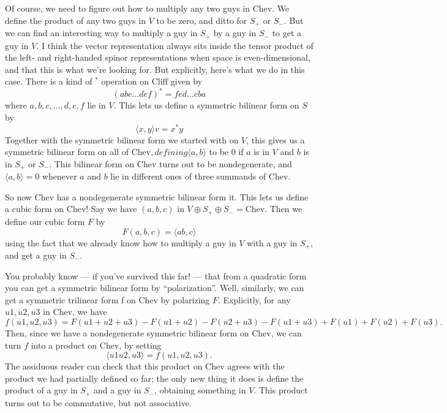 \documentclass{article}
\begin{document}
Of course, we need to figure out how to multiply any two guys in
\(\mathrm{Chev}\). We define the product of any two guys in \(V\) to be
zero, and ditto for \(S_+\) or \(S_-\). But we can find an interesting
way to multiply a guy in \(S_+\) by a guy in \(S_-\) to get a guy in
\(V\). I think the vector representation always sits inside the tensor
product of the left- and right-handed spinor representations when space
is even-dimensional, and that this is what we're looking for. But
explicitly, here's what we do in this case. There is a kind of \({}^*\)
operation on \(\mathrm{Cliff}\) given by
\[(abc \ldots def)^* = fed\ldots cba\] where \(a,b,c,\ldots,d,e,f\) lie
in \(V\). This lets us define a symmetric bilinear form on \(S\) by
\[\langle x,y\rangle v = x^* y\] Together with the symmetric bilinear
form we started with on \(V\), this gives us a symmetric bilinear form
on all of \(\mathrm{Chev}, defining \langle a,b \rangle\) to be \(0\) if
\(a\) is in \(V\) and \(b\) is in \(S_+\) or \(S_-\). This bilinear form
on \(\mathrm{Chev}\) turns out to be nondegenerate, and
\(\langle a,b \rangle = 0\) whenever \(a\) and \(b\) lie in different
ones of three summands of \(\mathrm{Chev}\).

So now \(\mathrm{Chev}\) has a nondegenerate symmetric bilinear form it.
This lets us define a cubic form on \(\mathrm{Chev}\)! Say we have
\((a,b,c)\) in \(V \oplus S_+ \oplus S_- = \mathrm{Chev}\). Then we
define our cubic form \(F\) by \[F(a,b,c) = \langle ab,c \rangle\] using
the fact that we already know how to multiply a guy in \(V\) with a guy
in \(S_+\), and get a guy in \(S_-\).

You probably know --- if you've survived this far! --- that from a
quadratic form you can get a symmetric bilinear form by
``polarization''. Well, similarly, we can get a symmetric trilinear form
f on \(\mathrm{Chev}\) by polarizing \(F\). Explicitly, for any
\(u1,u2,u3\) in \(\mathrm{Chev}\), we have
\[f(u1,u2,u3) =  F(u1 + u2 + u3) -F(u1 + u2) -F(u2 + u3) -F(u1 + u3) +F(u1) +F(u2) +F(u3).\]
Then, since we have a nondegenerate symmetric bilinear form on
\(\mathrm{Chev}\), we can turn \(f\) into a product on
\(\mathrm{Chev}\), by setting
\[\langle u1 u2, u3 \rangle = f(u1,u2,u3).\] The assiduous reader can
check that this product on \(\mathrm{Chev}\) agrees with the product we
had partially defined so far; the only new thing it does is define the
product of a guy in \(S_+\) and a guy in \(S_-\), obtaining something in
\(V\). This product turns out to be commutative, but not associative.
\end{document}
